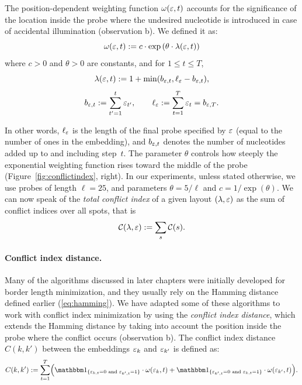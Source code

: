 The position-dependent weighting function $\omega(\varepsilon,t)$ accounts for the
significance of the location inside the probe where the undesired nucleotide is
introduced in case of accidental illumination (observation b). We defined it as:
\begin{equation}\label{eq:pos_mult}
\omega(\varepsilon,t) := c \cdot \exp{\left(\theta \cdot \lambda(\varepsilon,t)\right)}
\end{equation}
where $c>0$ and $\theta>0$ are constants, and for $1\leq t\leq T$,
\begin{equation}\label{eq:base_pos}
  \lambda(\varepsilon,t) := 1 + \min(b_{\varepsilon,t},\ell_{\varepsilon} - b_{\varepsilon,t}),
\end{equation}
\begin{equation}\label{eq:b_ell}
  b_{\varepsilon,t} := \sum_{t'=1}^{t} \varepsilon_{t'},
  \qquad
  \ell_{\varepsilon} := \sum_{t=1}^{T} \varepsilon_t = b_{\varepsilon,T}.
\end{equation}

In other words, $\ell_\varepsilon$ is the length of the final probe specified by $\varepsilon$
(equal to the number of ones in the embedding), and $b_{\varepsilon,t}$ denotes the
number of nucleotides added up to and including step~$t$. The parameter $\theta$
controls how steeply the exponential weighting function rises toward the middle
of the probe (Figure~\ref{fig:conflictindex}, right). In our experiments, unless
stated otherwise, we use probes of length $\ell=25$, and parameters
$\theta = 5/\ell$ and $c = 1/\exp{(\theta)}$.
We can now speak of the \emph{total conflict index} of a given layout
$(\lambda,\varepsilon)$ as the sum of conflict indices over all spots, that is
\begin{equation}
\label{eq:total_conf_idx}
  {\mathcal{C}}(\lambda,\varepsilon) := \sum_{s} {\mathcal{C}}(s).
\end{equation}

\paragraph{Conflict index distance.}
Many of the algorithms discussed in later chapters were initially developed for
border length minimization, and they usually rely on the Hamming distance
defined earlier (\ref{eq:hamming}). We have adapted some of these algorithms to
work with conflict index minimization by using the \emph{conflict index
distance}, which extends the Hamming distance by taking into account the
position inside the probe where the conflict occurs (observation b). The
conflict index distance $C(k,k')$ between the embeddings $\varepsilon_k$ and
$\varepsilon_{k'}$ is defined as:
\begin{equation}
\label{eq:ci_dist}
C(k,k') := \sum_{t=1}^{T}
  \Bigl(
    \Ind{\eps_{k,t}=0 \text{ and } \eps_{k',t}=1}
    \cdot \omega(\eps_{k},t)
    +
    \Ind{\eps_{k',t}=0 \text{ and } \eps_{k,t}=1}
    \cdot \omega(\eps_{k'},t)
  \Bigr).
\end{equation}

